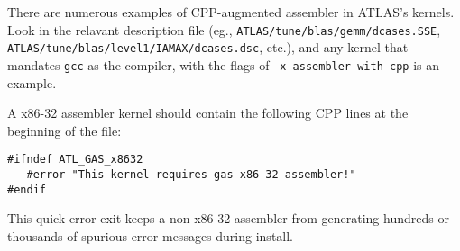 \documentclass[11pt]{article}
\begin{document}
There are numerous examples of CPP-augmented assembler in ATLAS's kernels.
Look in the relavant description file (eg., 
{\tt ATLAS/tune/blas/gemm/dcases.SSE}, \\
{\tt ATLAS/tune/blas/level1/IAMAX/dcases.dsc}, etc.), and any kernel that
mandates {\tt gcc} as the compiler, with the flags of 
{\tt -x assembler-with-cpp} is an example.

A x86-32 assembler kernel should contain the following CPP lines at the
beginning of the file:
\begin{verbatim}
#ifndef ATL_GAS_x8632
   #error "This kernel requires gas x86-32 assembler!"
#endif
\end{verbatim}
This quick error exit keeps a non-x86-32 assembler from generating hundreds
or thousands of spurious error messages during install.

\newpage
\end{document}
